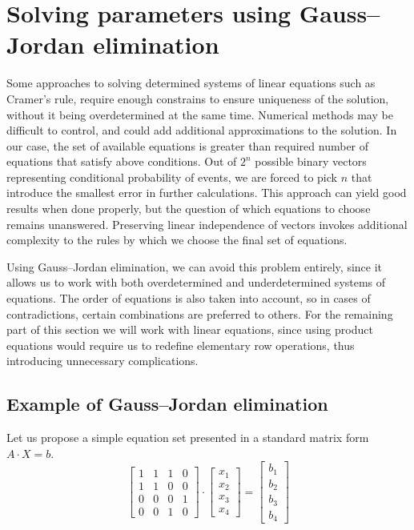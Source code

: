 \section{Solving parameters using Gauss--Jordan elimination}
Some approaches to solving determined systems of linear equations such as Cramer's rule, require enough constrains to ensure uniqueness of the solution, without it being overdetermined at the same time.
Numerical methods may be difficult to control, and could add additional approximations to the solution.
In our case, the set of available equations is greater than required number of equations that satisfy above conditions.
Out of $2^n$ possible binary vectors representing conditional probability of events, we are forced to pick $n$ that introduce the smallest error in further calculations.
This approach can yield good results when done properly, but the question of which equations to choose remains unanswered.
Preserving linear independence of vectors invokes additional complexity to the rules by which we choose the final set of equations.

Using Gauss--Jordan elimination, we can avoid this problem entirely, since it allows us to work with both overdetermined and underdetermined systems of equations.
The order of equations is also taken into account, so in cases of contradictions, certain combinations are preferred to others.
For the remaining part of this section we will work with linear equations, since using product equations would require us to redefine elementary row operations, thus introducing unnecessary complications.
\subsection{Example of Gauss--Jordan elimination}
Let us propose a simple equation set presented in a standard matrix form $A \cdot X = b$.
\begin{equation}
    \begin{bmatrix}
        1 & 1 & 1 & 0 \\
        1 & 1 & 0 & 0 \\
        0 & 0 & 0 & 1 \\
        0 & 0 & 1 & 0
    \end{bmatrix} \cdot
    \begin{bmatrix}
        x_1 \\ x_2 \\ x_3 \\ x_4
    \end{bmatrix} = 
    \begin{bmatrix}
        b_1 \\ b_2 \\ b_3 \\ b_4
    \end{bmatrix}
\end{equation}

